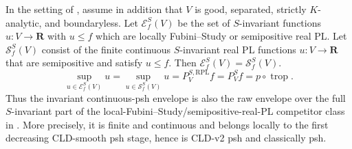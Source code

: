 \begin{corollary}
\label{cor:p033-invariant-toric-semipositive-real-pl-envelope}
In the setting of
, assume in addition that
$V$ is good, separated, strictly \(K\)-analytic, and boundaryless.  Let
\(\mathcal E^S_f(V)\) be the set of \(S\)-invariant functions
\(u:V\to\mathbf R\) with \(u\leq f\) which are locally Fubini--Study or
semipositive real PL.  Let \(\mathcal S^S_f(V)\) consist of the finite
continuous \(S\)-invariant real PL functions \(u:V\to\mathbf R\) that are
semipositive and satisfy \(u\leq f\).  Then
\(\mathcal E^S_f(V)=\mathcal S^S_f(V)\).
\[
 \sup_{u\in\mathcal E^S_f(V)}u
 =\sup_{u\in\mathcal S^S_f(V)}u
 =P^{S,\mathrm{RPL}}_Vf=P^S_Vf=p\circ\operatorname{trop}.
\]
Thus the invariant continuous-psh envelope is also the raw envelope over
the full \(S\)-invariant part of the local-Fubini--Study/semipositive-real-PL
competitor class in .  More
precisely, it is finite and continuous and belongs locally to the first
decreasing CLD-smooth psh stage, hence is CLD-v2 psh and classically psh.
\end{corollary}
